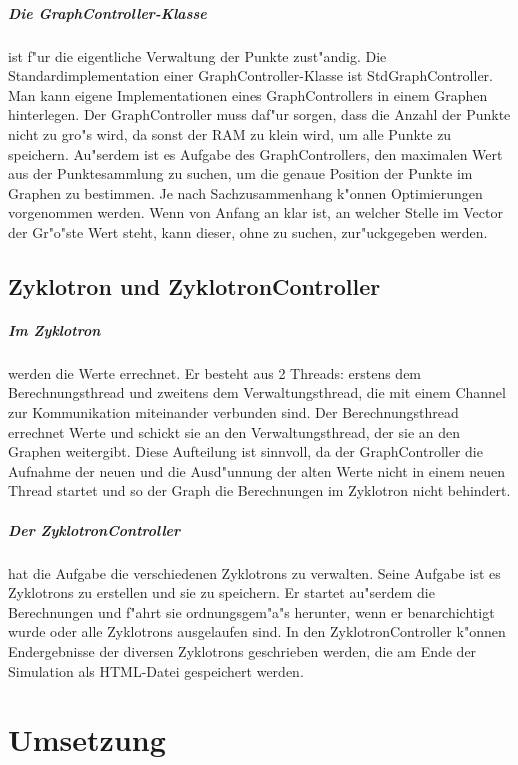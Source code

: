 \documentclass[14pt, a4paper]{report}
\begin{document}
\paragraph{Die GraphController-Klasse} ist f"ur die eigentliche Verwaltung der Punkte
zust"andig. Die Standardimplementation einer GraphController-Klasse ist 
StdGraphController. Man kann eigene Implementationen eines GraphControllers in einem
Graphen hinterlegen. Der GraphController muss daf"ur sorgen, dass die Anzahl der Punkte
nicht zu gro"s wird, da sonst der RAM zu klein wird, um alle Punkte zu speichern. 
Au"serdem ist es Aufgabe des GraphControllers, den maximalen Wert aus der Punktesammlung
zu suchen, um die genaue Position der Punkte im Graphen zu bestimmen. 
Je nach Sachzusammenhang k"onnen Optimierungen vorgenommen werden. Wenn von
Anfang an klar ist, an welcher Stelle im Vector der Gr"o"ste Wert steht, kann dieser,
ohne zu suchen, zur"uckgegeben werden.

\section{Zyklotron und ZyklotronController}
\paragraph{Im Zyklotron} werden die Werte errechnet. Er besteht aus 2 Threads: erstens
dem Berechnungsthread und zweitens dem Verwaltungsthread, die mit einem Channel zur
Kommunikation miteinander verbunden sind. 
Der Berechnungsthread errechnet Werte und schickt sie an
den Verwaltungsthread, der sie an den Graphen weitergibt. Diese Aufteilung ist sinnvoll,
da der GraphController die Aufnahme der neuen und die Ausd"unnung der alten Werte nicht 
in einem neuen Thread startet und so der Graph die Berechnungen im Zyklotron nicht 
behindert.

\paragraph{Der ZyklotronController} hat die Aufgabe die verschiedenen Zyklotrons zu
verwalten. Seine Aufgabe ist es Zyklotrons zu erstellen und sie zu speichern. Er startet
au"serdem die Berechnungen und f"ahrt sie ordnungsgem"a"s herunter, wenn er 
benarchichtigt wurde oder alle Zyklotrons ausgelaufen sind. In den ZyklotronController
k"onnen Endergebnisse der diversen Zyklotrons geschrieben werden, die am Ende der 
Simulation als HTML-Datei gespeichert werden.

\chapter{Umsetzung}
\end{document}
